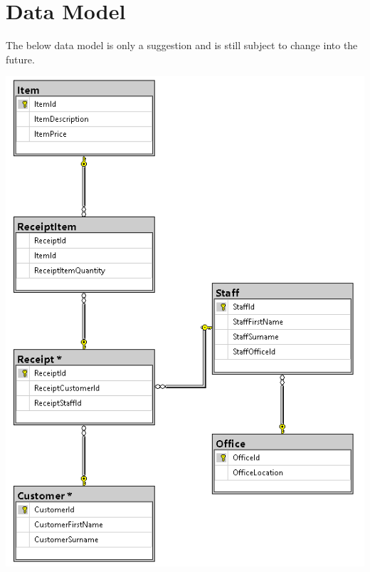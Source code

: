 \documentclass{article}
\begin{document}
    \newpage
    \section{Data Model}
    The below data model is only a suggestion and is still subject to change into the future.
        \begin{center}
            \includegraphics{Images/Suggested_Schema.PNG}
        \end{center}

    \newpage
\end{document}
